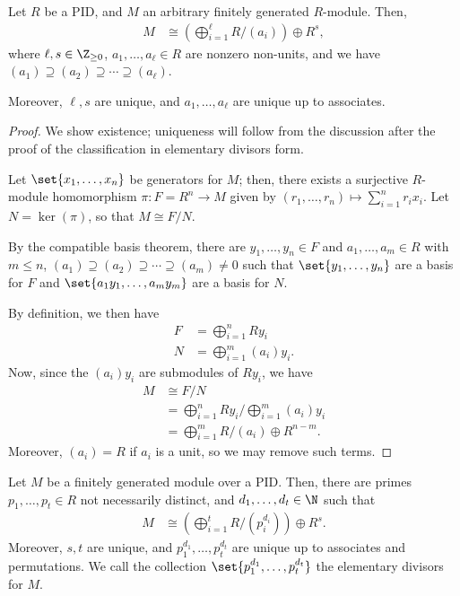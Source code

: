 \documentclass[10pt]{mypackage}
\begin{document}
\begin{theorem}
  Let $R$ be a PID, and $M$ an arbitrary finitely generated $R$-module. Then,
  \begin{align*}
    M &\cong \left( \bigoplus_{i=1}^{\ell} R/\left( a_i \right) \right) \oplus R^{s},
  \end{align*}
  where $\ell,s\in \Z_{\geq 0}$, $a_1,\dots,a_{\ell}\in R$ are nonzero non-units, and we have $\left( a_1 \right)\supseteq \left( a_2 \right)\supseteq\cdots\supseteq \left( a_{\ell} \right)$.

  Moreover, $\ell,s$ are unique, and $a_1,\dots,a_{\ell}$ are unique up to associates.
\end{theorem}
\begin{proof}
  We show existence; uniqueness will follow from the discussion after the proof of the classification in elementary divisors form.

  Let $\set{x_1,\dots,x_n}$ be generators for $M$; then, there exists a surjective $R$-module homomorphism $\pi\colon F = R^n\rightarrow M$ given by $\left( r_1,\dots,r_n \right)\mapsto \sum_{i=1}^{n}r_ix_i$. Let $N = \ker\left( \pi \right)$, so that $M\cong F/N$.

  By the compatible basis theorem, there are $y_1,\dots,y_n\in F$ and $a_1,\dots,a_m\in R$ with $m\leq n$, $\left( a_1 \right)\supseteq \left( a_2 \right)\supseteq\cdots\supseteq \left( a_m \right)\neq 0$ such that $\set{y_1,\dots,y_n}$ are a basis for $F$ and $\set{a_1y_1,\dots,a_my_m}$ are a basis for $N$.

  By definition, we then have
  \begin{align*}
    F &= \bigoplus_{i=1}^{n} Ry_i\\
    N &= \bigoplus_{i=1}^{m}\left( a_i \right)y_i.
  \end{align*}
  Now, since the $\left( a_i \right)y_i$ are submodules of $Ry_i$, we have
  \begin{align*}
    M &\cong F/N\\
      &= \bigoplus_{i=1}^{n}Ry_i/\bigoplus_{i=1}^{m}\left( a_i \right)y_i\\
      &= \bigoplus_{i=1}^{m}R/\left( a_i \right)\oplus R^{n-m}.
  \end{align*}
  Moreover, $\left( a_i \right) = R$ if $a_i$ is a unit, so we may remove such terms.
\end{proof}
\begin{theorem}
  Let $M$ be a finitely generated module over a PID. Then, there are primes $p_1,\dots,p_t\in R$ not necessarily distinct, and $d_1,\dots,d_t\in \N$ such that
  \begin{align*}
    M &\cong \left( \bigoplus_{i=1}^{t}R/\left( p_i^{d_i} \right) \right) \oplus R^{s}.
  \end{align*}
  Moreover, $s,t$ are unique, and $p_1^{d_1},\dots,p_t^{d_t}$ are unique up to associates and permutations. We call the collection $\set{p_1^{d_1},\dots,p_t^{d_t}}$ the elementary divisors for $M$.
\end{theorem}
\end{document}
